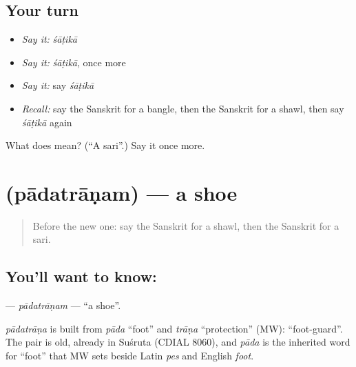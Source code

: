 \subsection*{Your turn}
\begin{itemize}
\raggedright
  \item \emph{Say it:} \emph{śāṭikā}
  \item \emph{Say it:} \emph{śāṭikā}, once more
  \item \emph{Say it:} say \emph{śāṭikā}
  \item \emph{Recall:} say the Sanskrit for a bangle, then the Sanskrit for a shawl, then say \emph{śāṭikā} again
\end{itemize}

\begin{tcolorbox}[breakable,colback=teal!4,colframe=teal!35!black,title={Before you move on}]
What does  mean? (\textquotedblleft{}A sari\textquotedblright{}.) Say it once more.
\end{tcolorbox}
\section[\texorpdfstring{\sk{पादत्राणम्} (pādatrāṇam)}{पादत्राणम् (pādatrāṇam)}]{ (pādatrāṇam) — a shoe}

\label{lesson:SA-C104-padatranam}



\begin{quote}
Before the new one: say the Sanskrit for a shawl, then the Sanskrit for a sari.
\end{quote}

\subsection*{You'll want to know: }
\textbf{} — \emph{pādatrāṇam} — \textquotedblleft{}a shoe\textquotedblright{}.

\begin{cousinweb}
\emph{pādatrāṇa} is built from \emph{pāda} \textquotedblleft{}foot\textquotedblright{} and \emph{trāṇa} \textquotedblleft{}protection\textquotedblright{} (MW): \textquotedblleft{}foot-guard\textquotedblright{}. The pair is old, already in Suśruta (CDIAL 8060), and \emph{pāda} is the inherited word for \textquotedblleft{}foot\textquotedblright{} that MW sets beside Latin \emph{pes} and English \emph{foot}.
\end{cousinweb}

